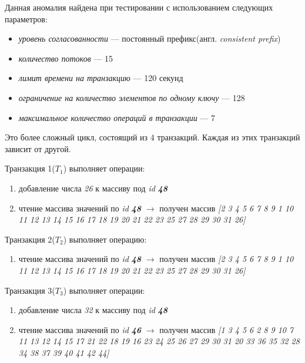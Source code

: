 \documentclass[12pt,  openany]{book}
\begin{document}
\par Данная аномалия найдена при тестировании с использованием следующих параметров: 
\begin{itemize}
\item[] \textit{уровень согласованности} --- постоянный префикс(англ.  \textit{consistent prefix})
\item[] \textit{количество потоков} --- 15
\item[] \textit{лимит времени на транзакцию} --- 120 секунд
\item[] \textit{ограничение на количество элементов по одному ключу} --- 128
\item[] \textit{максимальное количество операций в транзакции} --- 7
\end{itemize}

Это более сложный цикл, состоящий из 4 транзакций.  Каждая из этих транзакций зависит от другой.  \par

Транзакция 1(\textbf{$T_1$}) выполняет операции:
\begin{enumerate}
\item добавление числа \textit{26} к массиву под \textit{id} \textit{\textbf{48}}
\item чтение массива значений по \textit{id} \textit{\textbf{48}} $\rightarrow$ получен массив \textit{[2 3 4 5 6 7 8 9 1 10 11 12 13 14 15 16 17 18 19 20 21 22 23 25 27 28 29 30 31 26]}
\end{enumerate}

\par Транзакция 2(\textbf{$T_2$}) выполняет операцию:
\begin{enumerate}
\item чтение массива значений по \textit{id} \textit{\textbf{48}} $\rightarrow$ получен массив \textit{[2 3 4 5 6 7 8 9 1 10 11 12 13 14 15 16 17 18 19 20 21 22 23 25 27 28 29 30 31 26]}
\end{enumerate}

\par Транзакция 3(\textbf{$T_3$}) выполняет операции:
\begin{enumerate}
\item добавление числа \textit{32} к массиву под \textit{id} \textit{\textbf{48}}
\item чтение массива значений по \textit{id} \textit{\textbf{46}} $\rightarrow$ получен массив \textit{[1 3 4 5 6 2 8 9 10 7 11 13 12 14 15 17 21 22 18 19 16 23 24 25 26 27 29 30 31 20 33 36 35 32 28 34 38 37 39 40 41 42 44]}
\end{enumerate}
\end{document}
